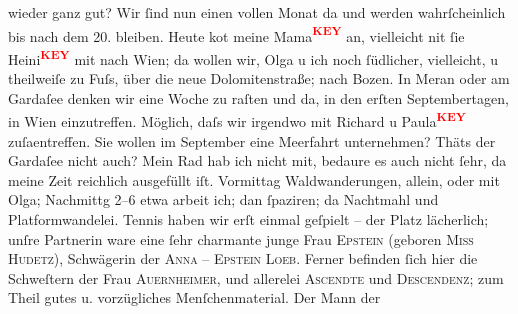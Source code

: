 \begin{ledgroupsized}[t]{13cm}
               wieder ganz gut? Wir ſind nun einen vollen Monat da und werden wahrſcheinlich bis
               nach dem 20. bleiben. Heute ko{\geminationm}t meine Mama\textcolor{red}{\textsuperscript{\textbf{KEY}}} an, vielleicht ni{\geminationm}t ſie Heini\textcolor{red}{\textsuperscript{\textbf{KEY}}} mit nach Wien; da{\geminationn} wollen wir,
                  Olga u ich noch ſüdlicher, vielleicht, u
               theilweiſe zu Fuſs, über die neue Dolomitenstraße; nach Bozen. In Meran oder am Gardaſee denken wir eine Woche zu raſten und da{\geminationn}, in den erſten Septembertagen, in Wien
               einzutreffen. Möglich, daſs wir irgendwo mit {\pb}Richard u Paula\textcolor{red}{\textsuperscript{\textbf{KEY}}}
                  zuſa{\geminationm}entreffen. Sie wollen im September eine
               Meerfahrt unternehmen? Thäts der Gardaſee nicht
               auch? Mein Rad hab ich nicht mit, bedaure es auch nicht ſehr, da meine Zeit reichlich
               ausgefüllt iſt. Vormittag Waldwanderungen, allein, oder mit Olga; Nachmittg 2–6 etwa arbeit ich; dan ſpaziren; da{\geminationn} Nachtmahl und Platformwandelei. Tennis haben wir erſt
               einmal geſpielt – der Platz lächerlich; unſre Partnerin ware eine ſehr charmante
               junge Frau \textsc{Epstein} (geboren \textsc{Miss Hudetz}), Schwägerin der \textsc{Anna – Epstein Loeb}. Ferner befinden ſich hier die Schweſtern der Frau \textsc{Auernheimer}, und allerelei \textsc{Ascendte} und \textsc{Descendenz}; zum Theil gutes u. vorzügliches Menſchenmaterial. Der Mann der

\end{ledgroupsized}
